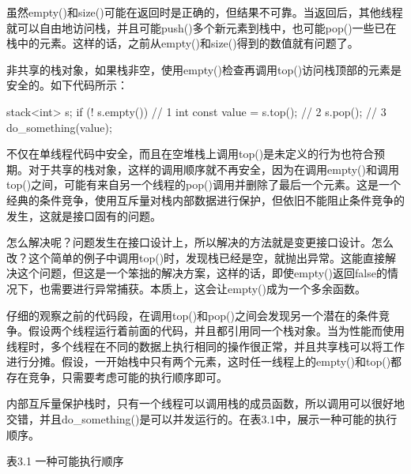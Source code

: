 虽然empty()和size()可能在返回时是正确的，但结果不可靠。当返回后，其他线程就可以自由地访问栈，并且可能push()多个新元素到栈中，也可能pop()一些已在栈中的元素。这样的话，之前从empty()和size()得到的数值就有问题了。

非共享的栈对象，如果栈非空，使用empty()检查再调用top()访问栈顶部的元素是安全的。如下代码所示：

\begin{cpp}
stack<int> s;
if (! s.empty()){    // 1
  int const value = s.top();    // 2
  s.pop();    // 3
  do_something(value);
}
\end{cpp}
不仅在单线程代码中安全，而且在空堆栈上调用top()是未定义的行为也符合预期。对于共享的栈对象，这样的调用顺序就不再安全，因为在调用empty()和调用top()之间，可能有来自另一个线程的pop()调用并删除了最后一个元素。这是一个经典的条件竞争，使用互斥量对栈内部数据进行保护，但依旧不能阻止条件竞争的发生，这就是接口固有的问题。

怎么解决呢？问题发生在接口设计上，所以解决的方法就是变更接口设计。怎么改？这个简单的例子中调用top()时，发现栈已经是空，就抛出异常。这能直接解决这个问题，但这是一个笨拙的解决方案，这样的话，即使empty()返回false的情况下，也需要进行异常捕获。本质上，这会让empty()成为一个多余函数。

仔细的观察之前的代码段，在调用top()和pop()之间会发现另一个潜在的条件竞争。假设两个线程运行着前面的代码，并且都引用同一个栈对象。当为性能而使用线程时，多个线程在不同的数据上执行相同的操作很正常，并且共享栈可以将工作进行分摊。假设，一开始栈中只有两个元素，这时任一线程上的empty()和top()都存在竞争，只需要考虑可能的执行顺序即可。

内部互斥量保护栈时，只有一个线程可以调用栈的成员函数，所以调用可以很好地交错，并且do\_something()是可以并发运行的。在表3.1中，展示一种可能的执行顺序。

表3.1 一种可能执行顺序


